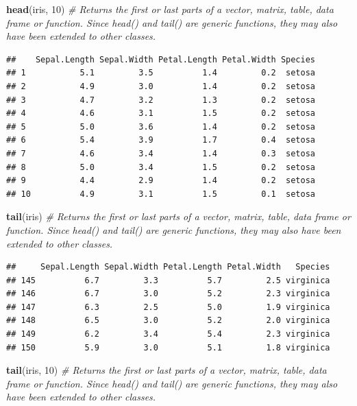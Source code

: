 \documentclass[]{article}
\newenvironment{Shaded}{\begin{snugshade}}{\end{snugshade}}
\newcommand{\CommentTok}[1]{\textcolor[rgb]{0.56,0.35,0.01}{\textit{#1}}}
\newcommand{\DecValTok}[1]{\textcolor[rgb]{0.00,0.00,0.81}{#1}}
\newcommand{\KeywordTok}[1]{\textcolor[rgb]{0.13,0.29,0.53}{\textbf{#1}}}
\newcommand{\NormalTok}[1]{#1}
\begin{document}
\begin{Shaded}
\begin{Highlighting}[]
\KeywordTok{head}\NormalTok{(iris, }\DecValTok{10}\NormalTok{) }\CommentTok{# Returns the first or last parts of a vector, matrix, table, data frame or function. Since head() and tail() are generic functions, they may also have been extended to other classes.}
\end{Highlighting}
\end{Shaded}

\begin{verbatim}
##    Sepal.Length Sepal.Width Petal.Length Petal.Width Species
## 1           5.1         3.5          1.4         0.2  setosa
## 2           4.9         3.0          1.4         0.2  setosa
## 3           4.7         3.2          1.3         0.2  setosa
## 4           4.6         3.1          1.5         0.2  setosa
## 5           5.0         3.6          1.4         0.2  setosa
## 6           5.4         3.9          1.7         0.4  setosa
## 7           4.6         3.4          1.4         0.3  setosa
## 8           5.0         3.4          1.5         0.2  setosa
## 9           4.4         2.9          1.4         0.2  setosa
## 10          4.9         3.1          1.5         0.1  setosa
\end{verbatim}

\begin{Shaded}
\begin{Highlighting}[]
\KeywordTok{tail}\NormalTok{(iris) }\CommentTok{# Returns the first or last parts of a vector, matrix, table, data frame or function. Since head() and tail() are generic functions, they may also have been extended to other classes.}
\end{Highlighting}
\end{Shaded}

\begin{verbatim}
##     Sepal.Length Sepal.Width Petal.Length Petal.Width   Species
## 145          6.7         3.3          5.7         2.5 virginica
## 146          6.7         3.0          5.2         2.3 virginica
## 147          6.3         2.5          5.0         1.9 virginica
## 148          6.5         3.0          5.2         2.0 virginica
## 149          6.2         3.4          5.4         2.3 virginica
## 150          5.9         3.0          5.1         1.8 virginica
\end{verbatim}

\begin{Shaded}
\begin{Highlighting}[]
\KeywordTok{tail}\NormalTok{(iris, }\DecValTok{10}\NormalTok{) }\CommentTok{# Returns the first or last parts of a vector, matrix, table, data frame or function. Since head() and tail() are generic functions, they may also have been extended to other classes.}
\end{Highlighting}
\end{Shaded}
\end{document}

